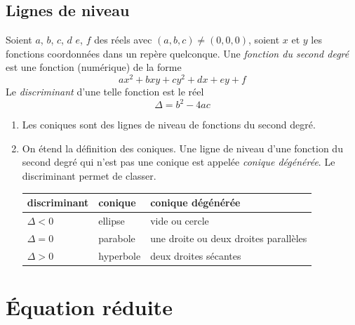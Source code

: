 \subsection{Lignes de niveau}
\begin{defi}
 Soient $a$, $b$, $c$, $d$ $e$, $f$ des réels avec $(a,b,c)\neq(0,0,0)$, soient $x$ et $y$ les fonctions coordonnées dans un repère quelconque. Une \emph{fonction du second degré} est une fonction (numérique) de la forme
\begin{displaymath}
 ax^2 + bxy +cy^2 +dx+ey+f
\end{displaymath}
Le \emph{discriminant} d'une telle fonction est le réel
\begin{displaymath}
 \Delta = b^2 -4ac
\end{displaymath}
\end{defi}
\begin{enumerate}
 \item Les coniques sont des lignes de niveau de fonctions du second degré.
 \item On étend la définition des coniques. Une ligne de niveau d'une fonction du second degré qui n'est pas une conique est appelée \emph{conique dégénérée}. Le discriminant permet de classer.
\begin{center}
\renewcommand{\arraystretch}{1.2}
\begin{tabular}{|l|l|l|}\hline
discriminant & conique & conique dégénérée\\\hline
$\Delta <0$ & ellipse & vide ou cercle\\ \hline
$\Delta =0$ & parabole & une droite ou deux droites parallèles\\ \hline
$\Delta >0$ & hyperbole & deux droites sécantes\\ \hline
\end{tabular}
\end{center}
 
\end{enumerate}



\section{\'Equation réduite}
